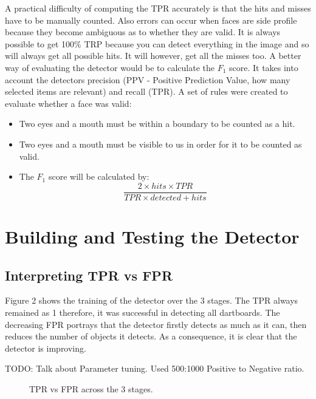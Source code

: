 \documentclass[a4paper]{article}
\begin{document}
A practical difficulty of computing the TPR accurately is that the hits and
misses have to be manually counted. Also errors can occur when faces are side
profile because they become ambiguous as to whether they are valid. It is
always possible to get 100\% TRP because you can detect everything in the image
and so will always get all possible hits. It will however, get all the misses
too. A better way of evaluating the detector would be to calculate the
\(F_{1}\) score. It takes into account the detectors precision (PPV - Positive
Prediction Value, how many selected items are relevant) and recall (TPR). A set
of rules were created to evaluate whether a face was valid: 

\begin{itemize}
  \item Two eyes and a mouth must be within a boundary to be counted as a hit. 
  \item Two eyes and a mouth must be visible to us in order for it to be counted as valid.
  \item The \(F_{1}\) score will be calculated by: \[\frac{2 \times hits \times TPR}{TPR \times detected + hits}\]
\end{itemize}

\section{Building and Testing the Detector}

\subsection{Interpreting TPR vs FPR}

Figure 2 shows the training of the detector over the 3 stages. The TPR always
remained as 1 therefore, it was successful in detecting all dartboards. The
decreasing FPR portrays that the detector firstly detects as much as it can,
then reduces the number of objects it detects. As a consequence, it is clear
that the detector is improving.

TODO: Talk about Parameter tuning.  Used 500:1000 Positive to Negative ratio.

\begin{figure}[H]
  \centering
  \caption{TPR vs FPR across the 3 stages.}
\end{figure}
\end{document}
